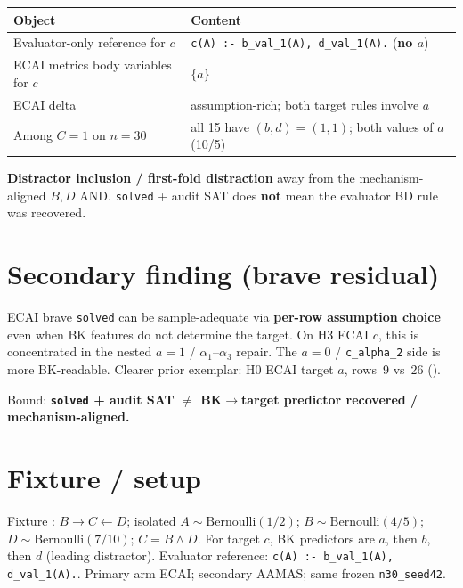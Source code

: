 \documentclass[11pt]{article}
\begin{document}
\begin{center}
\begin{tabular}{@{}L{0.40\textwidth}L{0.50\textwidth}@{}}
\toprule
Object & Content \\
\midrule
Evaluator-only reference for \(c\) &
  \texttt{c(A) :- b\_val\_1(A), d\_val\_1(A).} (\textbf{no \(a\)}) \\
ECAI metrics body variables for \(c\) & \(\{a\}\) \\
ECAI delta & assumption-rich; both target rules involve \(a\) \\
Among \(C{=}1\) on \(n{=}30\) &
  all 15 have \((b,d)=(1,1)\); both values of \(a\) (10/5) \\
\bottomrule
\end{tabular}
\end{center}

\textbf{Distractor inclusion / first-fold distraction} away from the
mechanism-aligned \(B,D\) AND.
\texttt{solved} + audit SAT does \textbf{not} mean the evaluator BD rule was
recovered.

\section{Secondary finding (brave residual)}

ECAI brave \texttt{solved} can be sample-adequate via \textbf{per-row
assumption choice} even when BK features do not determine the target.
On H3 ECAI \(c\), this is concentrated in the nested \(a{=}1\) /
\(\alpha_1\)--\(\alpha_3\) repair.
The \(a{=}0\) / \texttt{c\_alpha\_2} side is more BK-readable.
Clearer prior exemplar: H0 ECAI target \(a\), rows~9 vs~26
().

Bound: \textbf{\texttt{solved} + audit SAT \(\neq\) BK\(\to\)target predictor
recovered / mechanism-aligned.}

\section{Fixture / setup}

Fixture :
\(B\to C\leftarrow D\); isolated \(A\sim\mathrm{Bernoulli}(1/2)\);
\(B\sim\mathrm{Bernoulli}(4/5)\); \(D\sim\mathrm{Bernoulli}(7/10)\);
\(C=B\land D\).
For target \(c\), BK predictors are \(a\), then \(b\), then \(d\) (leading
distractor).
Evaluator reference: \texttt{c(A) :- b\_val\_1(A), d\_val\_1(A).}.
Primary arm ECAI; secondary AAMAS; same frozen \texttt{n30\_seed42}.
\end{document}
